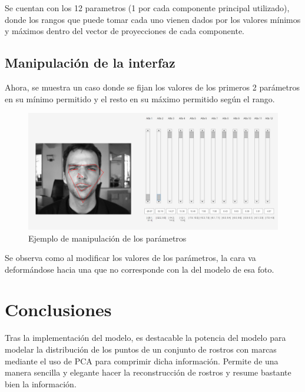 \documentclass[11pt, letterpaper]{article}
\begin{document}
Se cuentan con los 12 parametros (1 por cada componente principal utilizado), donde los rangos que puede tomar cada uno vienen dados por los valores mínimos y máximos dentro del vector de proyecciones de cada componente.

\newpage

\subsection{Manipulación de la interfaz}

Ahora, se muestra un caso donde se fijan los valores de los primeros 2 parámetros en su mínimo permitido y el resto en su máximo permitido según el rango.

\begin{figure}[h!]
	\centering %
	\includegraphics[width=1\textwidth]{IMG/G5.png} %
	\caption{Ejemplo de manipulación de los parámetros}
	\label{fig:f6}
\end{figure}

Se observa como al modificar los valores de los parámetros, la cara va deformándose hacia una que no corresponde con la del modelo de esa foto.



\newpage
	
\section{Conclusiones}

Tras la implementación del modelo, es destacable la potencia del modelo para modelar la distribución de los puntos de un conjunto de rostros con marcas mediante el uso de PCA para comprimir dicha información. Permite de una manera sencilla y elegante hacer la reconstrucción de rostros y resume bastante bien la información.
	
\end{document}

